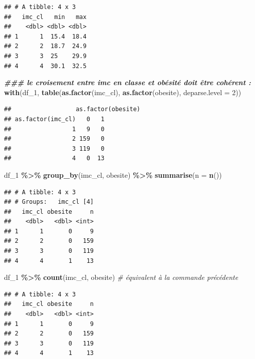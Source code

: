 \documentclass[
]{book}
\newenvironment{Shaded}{\begin{snugshade}}{\end{snugshade}}
\newcommand{\AttributeTok}[1]{\textcolor[rgb]{0.13,0.29,0.53}{#1}}
\newcommand{\CommentTok}[1]{\textcolor[rgb]{0.56,0.35,0.01}{\textit{#1}}}
\newcommand{\DecValTok}[1]{\textcolor[rgb]{0.00,0.00,0.81}{#1}}
\newcommand{\DocumentationTok}[1]{\textcolor[rgb]{0.56,0.35,0.01}{\textbf{\textit{#1}}}}
\newcommand{\FunctionTok}[1]{\textcolor[rgb]{0.13,0.29,0.53}{\textbf{#1}}}
\newcommand{\NormalTok}[1]{#1}
\newcommand{\SpecialCharTok}[1]{\textcolor[rgb]{0.81,0.36,0.00}{\textbf{#1}}}
\begin{document}
\begin{verbatim}
## # A tibble: 4 x 3
##   imc_cl   min   max
##    <dbl> <dbl> <dbl>
## 1      1  15.4  18.4
## 2      2  18.7  24.9
## 3      3  25    29.9
## 4      4  30.1  32.5
\end{verbatim}

\begin{Shaded}
\begin{Highlighting}[]
\DocumentationTok{\#\#\# le croisement entre imc en classe et obésité doit être cohérent :}
\FunctionTok{with}\NormalTok{(df\_1, }\FunctionTok{table}\NormalTok{(}\FunctionTok{as.factor}\NormalTok{(imc\_cl), }\FunctionTok{as.factor}\NormalTok{(obesite), }\AttributeTok{deparse.level =} \DecValTok{2}\NormalTok{))}
\end{Highlighting}
\end{Shaded}

\begin{verbatim}
##                  as.factor(obesite)
## as.factor(imc_cl)   0   1
##                 1   9   0
##                 2 159   0
##                 3 119   0
##                 4   0  13
\end{verbatim}

\begin{Shaded}
\begin{Highlighting}[]
\NormalTok{df\_1 }\SpecialCharTok{\%\textgreater{}\%} \FunctionTok{group\_by}\NormalTok{(imc\_cl, obesite) }\SpecialCharTok{\%\textgreater{}\%} \FunctionTok{summarise}\NormalTok{(}\AttributeTok{n =} \FunctionTok{n}\NormalTok{())}
\end{Highlighting}
\end{Shaded}

\begin{verbatim}
## # A tibble: 4 x 3
## # Groups:   imc_cl [4]
##   imc_cl obesite     n
##    <dbl>   <dbl> <int>
## 1      1       0     9
## 2      2       0   159
## 3      3       0   119
## 4      4       1    13
\end{verbatim}

\begin{Shaded}
\begin{Highlighting}[]
\NormalTok{df\_1 }\SpecialCharTok{\%\textgreater{}\%} \FunctionTok{count}\NormalTok{(imc\_cl, obesite) }\CommentTok{\# équivalent à la commande précédente}
\end{Highlighting}
\end{Shaded}

\begin{verbatim}
## # A tibble: 4 x 3
##   imc_cl obesite     n
##    <dbl>   <dbl> <int>
## 1      1       0     9
## 2      2       0   159
## 3      3       0   119
## 4      4       1    13
\end{verbatim}
\end{document}
